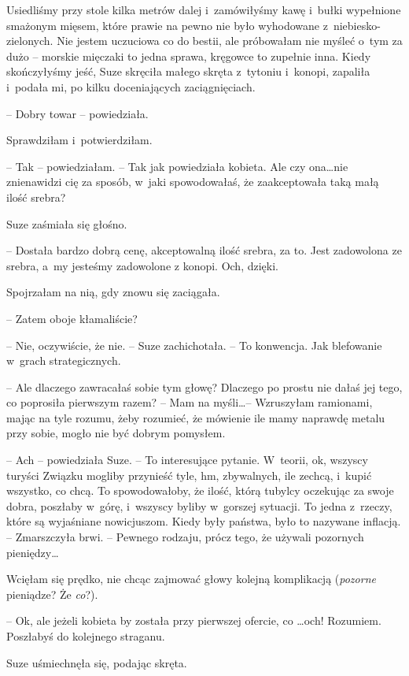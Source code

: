 \documentclass[oneside,polish,11pt,sfheadings]{mwbk}
\begin{document}
Usiedliśmy przy stole kilka metrów dalej i~zamówiłyśmy kawę i~bułki
wypełnione smażonym mięsem, które prawie na pewno nie było wyhodowane z~niebiesko-zielonych. Nie jestem uczuciowa co do bestii, ale próbowałam
nie myśleć o~tym za dużo -- morskie mięczaki to jedna sprawa, kręgowce to
zupełnie inna. Kiedy skończyłyśmy jeść, Suze skręciła małego skręta z~tytoniu i~konopi, zapaliła i~podała mi, po kilku doceniających
zaciągnięciach.

-- Dobry towar -- powiedziała.

Sprawdziłam i~potwierdziłam. 

-- Tak -- powiedziałam. -- Tak jak powiedziała
kobieta. Ale czy ona\ldots  nie znienawidzi cię za sposób, w~jaki
spowodowałaś, że zaakceptowała taką małą ilość srebra?

Suze zaśmiała się głośno. 

-- Dostała bardzo dobrą cenę, akceptowalną
ilość srebra, za to. Jest zadowolona ze srebra, a~my jesteśmy zadowolone
z konopi. Och, dzięki.

Spojrzałam na nią, gdy znowu się zaciągała. 

-- Zatem oboje kłamaliście?

-- Nie, oczywiście, że nie. -- Suze zachichotała. -- To konwencja. Jak
blefowanie w~grach strategicznych.

-- Ale dlaczego zawracałaś sobie tym głowę? Dlaczego po prostu nie dałaś
jej tego, co poprosiła pierwszym razem? -- Mam na myśli\ldots  -- Wzruszyłam
ramionami, mając na tyle rozumu, żeby rozumieć, że mówienie ile mamy
naprawdę metalu przy sobie, mogło nie być dobrym pomysłem.

-- Ach -- powiedziała Suze. -- To interesujące pytanie. W~teorii, ok,
wszyscy turyści Związku mogliby przynieść tyle, hm, zbywalnych, ile
zechcą, i~kupić wszystko, co chcą. To spowodowałoby, że ilość, którą
tubylcy oczekując za swoje dobra, poszłaby w~górę, i~wszyscy byliby w~gorszej sytuacji. To jedna z~rzeczy, które są wyjaśniane nowicjuszom.
Kiedy były państwa, było to nazywane inflacją. -- Zmarszczyła brwi. -- Pewnego rodzaju, prócz tego, że używali pozornych pieniędzy\ldots 

Wcięłam się prędko, nie chcąc zajmować głowy kolejną komplikacją
(\textit{pozorne} pieniądze? Że \textit{co}?).

-- Ok, ale jeżeli kobieta by została przy pierwszej ofercie, co \ldots  och!
Rozumiem. Poszłabyś do kolejnego straganu.

Suze uśmiechnęła się, podając skręta. 
\end{document}
